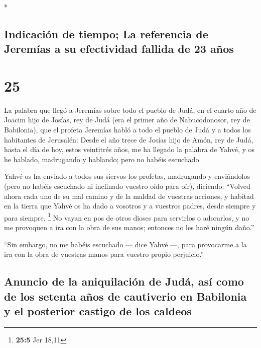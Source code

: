 \begin{paracol}{2}
\begin{otherlanguage}{english}
\end{otherlanguage}

\switchcolumn[0]*

\hypertarget{indicaciuxf3n-de-tiempo-la-referencia-de-jeremuxedas-a-su-efectividad-fallida-de-23-auxf1os}{%
\subsection{Indicación de tiempo; La referencia de Jeremías a su
efectividad fallida de 23
años}\label{indicaciuxf3n-de-tiempo-la-referencia-de-jeremuxedas-a-su-efectividad-fallida-de-23-auxf1os}}

\hypertarget{section-48}{%
\section{25}\label{section-48}}

 La palabra que llegó a Jeremías sobre todo el pueblo de
Judá, en el cuarto año de Joacim hijo de Josías, rey de Judá (era el
primer año de Nabucodonosor, rey de Babilonia),  que el
profeta Jeremías habló a todo el pueblo de Judá y a todos los habitantes
de Jerusalén:  Desde el año trece de Josías hijo de Amón,
rey de Judá, hasta el día de hoy, estos veintitrés años, me ha llegado
la palabra de Yahvé, y os he hablado, madrugando y hablando; pero no
habéis escuchado.

 Yahvé os ha enviado a todos sus siervos los profetas,
madrugando y enviándolos (pero no habéis escuchado ni inclinado vuestro
oído para oír),  diciendo: ``Volved ahora cada uno de su
mal camino y de la maldad de vuestras acciones, y habitad en la tierra
que Yahvé os ha dado a vosotros y a vuestros padres, desde siempre y
para siempre. \footnote{\textbf{25:5} Jer 18,11}  No vayan
en pos de otros dioses para servirlos o adorarlos, y no me provoquen a
ira con la obra de sus manos; entonces no les haré ningún daño.''

 ``Sin embargo, no me habéis escuchado --- dice Yahvé ---,
para provocarme a la ira con la obra de vuestras manos para vuestro
propio perjuicio.''

\hypertarget{anuncio-de-la-aniquilaciuxf3n-de-juduxe1-asuxed-como-de-los-setenta-auxf1os-de-cautiverio-en-babilonia-y-el-posterior-castigo-de-los-caldeos}{%
\subsection{Anuncio de la aniquilación de Judá, así como de los setenta
años de cautiverio en Babilonia y el posterior castigo de los
caldeos}\label{anuncio-de-la-aniquilaciuxf3n-de-juduxe1-asuxed-como-de-los-setenta-auxf1os-de-cautiverio-en-babilonia-y-el-posterior-castigo-de-los-caldeos}}


\end{paracol}
